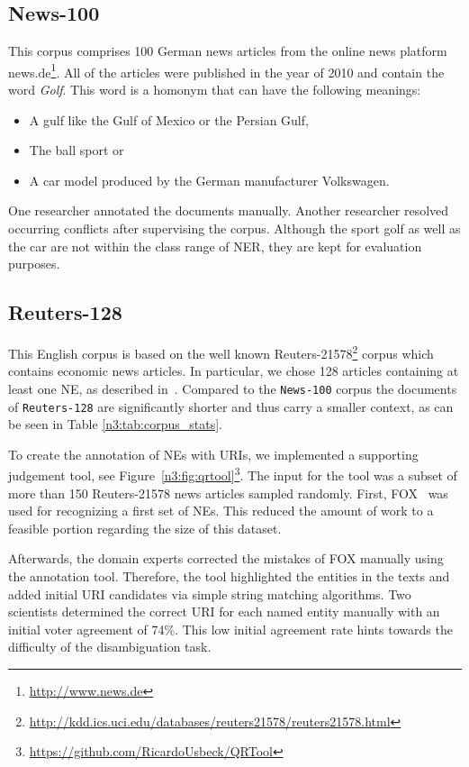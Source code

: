 \subsection{News-100}

This corpus comprises 100 German news articles from the online news platform news.de\footnote{\url{http://www.news.de}}. 
All of the articles were published in the year of 2010 and contain the word \emph{Golf}.
This word is a homonym that can have the following meanings:
\begin{itemize}
\item A gulf like the Gulf of Mexico or the Persian Gulf,
\item The ball sport or
\item A car model produced by the German manufacturer Volkswagen.
\end{itemize}

One researcher annotated the documents manually.
Another researcher resolved occurring conflicts after supervising the corpus.
Although the sport golf as well as the car are not within the class range of NER, they are kept for evaluation purposes.

\subsection{Reuters-128}

This English corpus is based on the well known Reuters-21578\footnote{\url{http://kdd.ics.uci.edu/databases/reuters21578/reuters21578.html}} corpus which contains economic news articles.
In particular, we chose 128 articles containing at least one NE, as described in~\cite{agdistis_iswc}.
Compared to the \texttt{News-100} corpus the documents of \texttt{Reuters-128} are significantly shorter and thus carry a smaller context, as can be seen in Table \ref{n3:tab:corpus_stats}.

To create the annotation of NEs with URIs, we implemented a supporting judgement tool, see Figure~\ref{n3:fig:qrtool}\footnote{\url{https://github.com/RicardoUsbeck/QRTool}}. 
The input for the tool was a subset of more than 150 Reuters-21578 news articles sampled randomly.
First, FOX~\cite{FOX} was used for recognizing a first set of NEs. 
This reduced the amount of work to a feasible portion regarding the size of this dataset.

Afterwards, the domain experts corrected the  mistakes of FOX manually using the annotation tool.
Therefore, the tool highlighted the entities in the texts and added initial URI candidates via simple string matching algorithms.
Two scientists determined the correct URI for each named entity manually with an initial voter agreement of 74\%.
This low initial agreement rate hints towards the difficulty of the disambiguation task.

